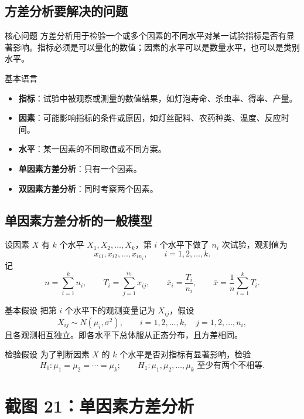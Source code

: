 \documentclass[UTF8,zihao=-4,fontset=fandol]{ctexart}
\begin{document}
\subsection{方差分析要解决的问题}

\begin{keybox}{核心问题}
方差分析用于检验一个或多个因素的不同水平对某一试验指标是否有显著影响。指标必须是可以量化的数值；因素的水平可以是数量水平，也可以是类别水平。
\end{keybox}

\begin{methodbox}{基本语言}
\begin{itemize}
  \item \textbf{指标}：试验中被观察或测量的数值结果，如灯泡寿命、杀虫率、得率、产量。
  \item \textbf{因素}：可能影响指标的条件或原因，如灯丝配料、农药种类、温度、反应时间。
  \item \textbf{水平}：某一因素的不同取值或不同方案。
  \item \textbf{单因素方差分析}：只有一个因素。
  \item \textbf{双因素方差分析}：同时考察两个因素。
\end{itemize}
\end{methodbox}

\subsection{单因素方差分析的一般模型}

设因素 $X$ 有 $k$ 个水平 $X_1,X_2,\ldots,X_k$，第 $i$ 个水平下做了 $n_i$ 次试验，观测值为
\[
x_{i1},x_{i2},\ldots,x_{in_i},\qquad i=1,2,\ldots,k.
\]
记
\[
n=\sum_{i=1}^{k}n_i,\qquad
T_i=\sum_{j=1}^{n_i}x_{ij},\qquad
\bar{x}_i=\frac{T_i}{n_i},\qquad
\bar{x}=\frac{1}{n}\sum_{i=1}^{k}T_i.
\]

\begin{keybox}{基本假设}
把第 $i$ 个水平下的观测变量记为 $X_{ij}$，假设
\[
X_{ij}\sim N(\mu_i,\sigma^2),\qquad i=1,2,\ldots,k,\quad j=1,2,\ldots,n_i,
\]
且各观测相互独立。即各水平下总体服从正态分布，且方差相同。
\end{keybox}

\begin{keybox}{检验假设}
为了判断因素 $X$ 的 $k$ 个水平是否对指标有显著影响，检验
\[
H_0:\mu_1=\mu_2=\cdots=\mu_k;
\qquad
H_1:\mu_1,\mu_2,\ldots,\mu_k \text{ 至少有两个不相等}.
\]
\end{keybox}

\section{截图 21：单因素方差分析}
\end{document}
